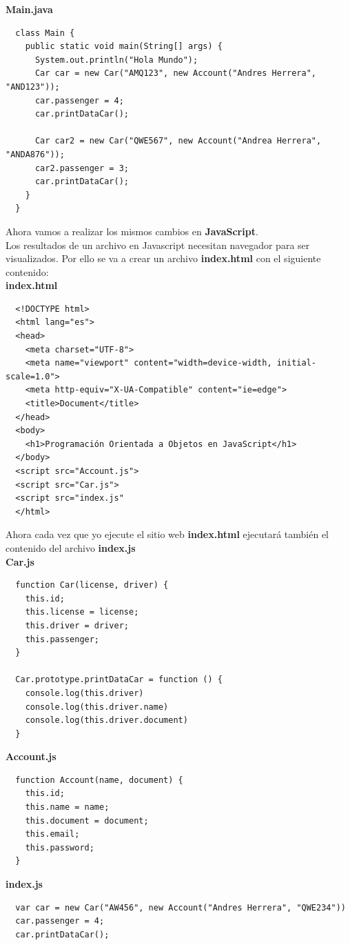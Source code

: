 \documentclass{article}
\begin{document}
\textbf{Main.java}
\begin{verbatim}
  class Main {
    public static void main(String[] args) {
      System.out.println("Hola Mundo");
      Car car = new Car("AMQ123", new Account("Andres Herrera", "AND123"));
      car.passenger = 4;
      car.printDataCar();

      Car car2 = new Car("QWE567", new Account("Andrea Herrera", "ANDA876"));
      car2.passenger = 3;
      car.printDataCar();
    }
  }
\end{verbatim}

Ahora vamos a realizar los mismos cambios en \textbf{JavaScript}.\\
Los resultados de un archivo en Javascript necesitan navegador para ser
visualizados. Por ello se va a crear un archivo \textbf{index.html} con el siguiente
contenido:\\

\textbf{index.html}
\begin{verbatim}
  <!DOCTYPE html>
  <html lang="es">
  <head>
    <meta charset="UTF-8">
    <meta name="viewport" content="width=device-width, initial-scale=1.0">
    <meta http-equiv="X-UA-Compatible" content="ie=edge">
    <title>Document</title>
  </head>
  <body>
    <h1>Programación Orientada a Objetos en JavaScript</h1>
  </body>
  <script src="Account.js">
  <script src="Car.js">
  <script src="index.js"
  </html>
\end{verbatim}

Ahora cada vez que yo ejecute el sitio web \textbf{index.html} ejecutará
también el contenido del archivo \textbf{index.js}\\

\textbf{Car.js}
\begin{verbatim}
  function Car(license, driver) {
    this.id;
    this.license = license;
    this.driver = driver;
    this.passenger;
  }

  Car.prototype.printDataCar = function () {
    console.log(this.driver)
    console.log(this.driver.name)
    console.log(this.driver.document)
  }
\end{verbatim}


\textbf{Account.js}
\begin{verbatim}
  function Account(name, document) {
    this.id;
    this.name = name;
    this.document = document;
    this.email;
    this.password;
  }
\end{verbatim}


\textbf{index.js}
\begin{verbatim}
  var car = new Car("AW456", new Account("Andres Herrera", "QWE234"))
  car.passenger = 4;
  car.printDataCar();
\end{verbatim}
\end{document}
